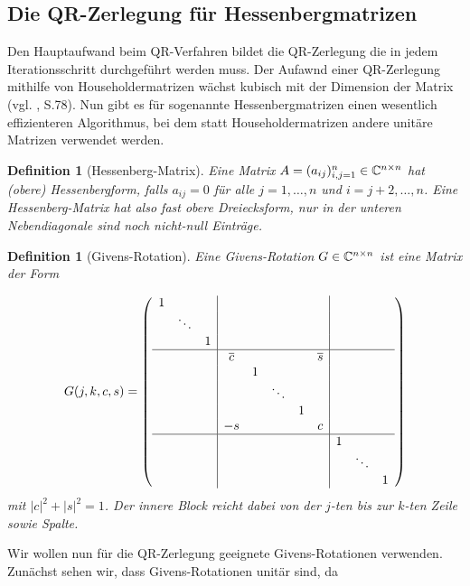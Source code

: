 \documentclass{article}
\theoremstyle{plain}
\newtheorem{definition} [theorem]{Definition}
\begin{document}
\subsection{Die QR-Zerlegung für Hessenbergmatrizen}

Den Hauptaufwand beim QR-Verfahren bildet die QR-Zerlegung die in jedem Iterationsschritt durchgeführt werden muss. Der Aufawnd einer QR-Zerlegung mithilfe von Householdermatrizen wächst kubisch mit der Dimension der Matrix (vgl. \cite{Num}, S.78). Nun gibt es für sogenannte Hessenbergmatrizen einen wesentlich effizienteren Algorithmus, bei dem statt Householdermatrizen andere unitäre Matrizen verwendet werden.

\begin{definition}[Hessenberg-Matrix]
	Eine Matrix $A = (a_{ij})_{i,j = 1}^n \in \mathbb{C}^{n \times n}$ hat (obere) Hessenbergform, falls $a_{ij} = 0$ für alle $j = 1,\dots,n$ und $i = j+2, \dots, n$. Eine Hessenberg-Matrix hat also fast obere Dreiecksform, nur in der unteren Nebendiagonale sind noch nicht-null Einträge.
\end{definition}

\begin{definition}[Givens-Rotation]
	Eine Givens-Rotation $G \in \mathbb{C}^{n\times n}$ ist eine Matrix der Form

	\begin{align*}
	G(j,k,c,s)  = \left(\begin{array}{ccc|ccccc|ccc}
	1 &  &  & & & & & & &\\
	& \ddots & & & & & & & & &\\
	& & 1 & & & & & & & \\
	\hline
	& & &  \overline{c} & & & & \overline{s} & & &\\
	& & & & 1 & & & & & &\\
	& & & & & \ddots & & & & &\\
	& & & & &  &1 & & & &\\
	& & & -s & & & & c & & &\\
	\hline
	& & & & & & & & 1 & &\\
	& & & & & & & & & \ddots &\\
	& & & & & & & & & & 1\\
	\end{array}\right)
	\end{align*}
	mit $|c|^2 + |s|^2 = 1$. Der innere Block reicht dabei von der $j$-ten bis zur $k$-ten Zeile sowie Spalte.
\end{definition}


Wir wollen nun für die QR-Zerlegung geeignete Givens-Rotationen verwenden. Zunächst sehen wir, dass Givens-Rotationen unitär sind, da
\end{document}
